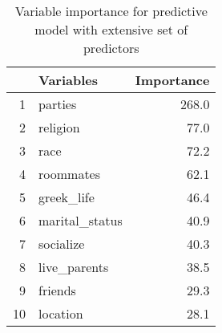 \begin{table}[ht]
\centering
\begin{tabular}{rlr}
  \toprule
 & Variables & Importance \\ 
  \midrule
1 & parties & 268.0 \\ 
  2 & religion & 77.0 \\ 
  3 & race & 72.2 \\ 
  4 & roommates & 62.1 \\ 
  5 & greek\_life & 46.4 \\ 
  6 & marital\_status & 40.9 \\ 
  7 & socialize & 40.3 \\ 
  8 & live\_parents & 38.5 \\ 
  9 & friends & 29.3 \\ 
  10 & location & 28.1 \\ 
   \bottomrule
\end{tabular}
\caption{Variable importance for predictive model with extensive set of predictors} 
\end{table}

